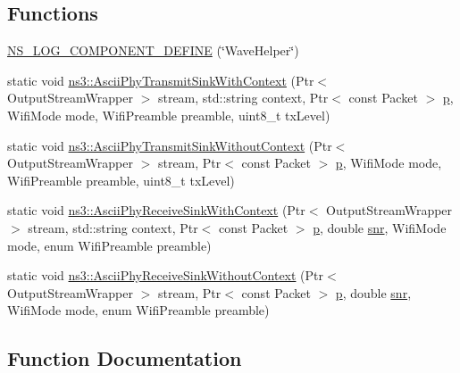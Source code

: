 \subsection*{Functions}
\begin{DoxyCompactItemize}
\item 
\hyperlink{wave-helper_8cc_ad90e3d5370e0c3ef522a46cf43987b7f}{N\+S\+\_\+\+L\+O\+G\+\_\+\+C\+O\+M\+P\+O\+N\+E\+N\+T\+\_\+\+D\+E\+F\+I\+NE} (\char`\"{}Wave\+Helper\char`\"{})
\item 
static void \hyperlink{namespacens3_ae217606eb9244d9c833b9dddbe1a964a}{ns3\+::\+Ascii\+Phy\+Transmit\+Sink\+With\+Context} (Ptr$<$ Output\+Stream\+Wrapper $>$ stream, std\+::string context, Ptr$<$ const Packet $>$ \hyperlink{lte__link__budget__x2__handover__measures_8m_ac9de518908a968428863f829398a4e62}{p}, Wifi\+Mode mode, Wifi\+Preamble preamble, uint8\+\_\+t tx\+Level)
\item 
static void \hyperlink{namespacens3_af1e94937b00eeb80a08c06ca300bfea5}{ns3\+::\+Ascii\+Phy\+Transmit\+Sink\+Without\+Context} (Ptr$<$ Output\+Stream\+Wrapper $>$ stream, Ptr$<$ const Packet $>$ \hyperlink{lte__link__budget__x2__handover__measures_8m_ac9de518908a968428863f829398a4e62}{p}, Wifi\+Mode mode, Wifi\+Preamble preamble, uint8\+\_\+t tx\+Level)
\item 
static void \hyperlink{namespacens3_a040ca8ac0d1c0a56f4e431307cb3058c}{ns3\+::\+Ascii\+Phy\+Receive\+Sink\+With\+Context} (Ptr$<$ Output\+Stream\+Wrapper $>$ stream, std\+::string context, Ptr$<$ const Packet $>$ \hyperlink{lte__link__budget__x2__handover__measures_8m_ac9de518908a968428863f829398a4e62}{p}, double \hyperlink{lte__pathloss_8m_ae6e82a215dff6b79fb6e9952a1b78453}{snr}, Wifi\+Mode mode, enum Wifi\+Preamble preamble)
\item 
static void \hyperlink{namespacens3_a7ca07e06f80459c9c62e3b4e9eb6ff40}{ns3\+::\+Ascii\+Phy\+Receive\+Sink\+Without\+Context} (Ptr$<$ Output\+Stream\+Wrapper $>$ stream, Ptr$<$ const Packet $>$ \hyperlink{lte__link__budget__x2__handover__measures_8m_ac9de518908a968428863f829398a4e62}{p}, double \hyperlink{lte__pathloss_8m_ae6e82a215dff6b79fb6e9952a1b78453}{snr}, Wifi\+Mode mode, enum Wifi\+Preamble preamble)
\end{DoxyCompactItemize}


\subsection{Function Documentation}
